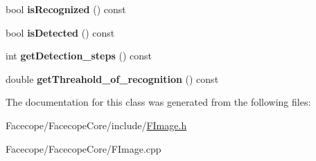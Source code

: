 \begin{DoxyCompactItemize}
$$bool {\bfseries is\+Recognized} () const
\item 
\mbox{\label{classFImage_a3a9633f8b7b7c0f64520770135c518b4}} 
bool {\bfseries is\+Detected} () const
\item 
\mbox{\label{classFImage_aeb31036059d0c85596118019d4ba8b5c}} 
int {\bfseries get\+Detection\+\_\+steps} () const
\item 
\mbox{\label{classFImage_acc32b56d339159ba4e8a6a16fd25e375}} 
double {\bfseries get\+Threahold\+\_\+of\+\_\+recognition} () const
\end{DoxyCompactItemize}


The documentation for this class was generated from the following files\+:\begin{DoxyCompactItemize}
\item 
Facecope/\+Facecope\+Core/include/\hyperlink{FImage_8h}{F\+Image.\+h}\item 
Facecope/\+Facecope\+Core/F\+Image.\+cpp\end{DoxyCompactItemize}

